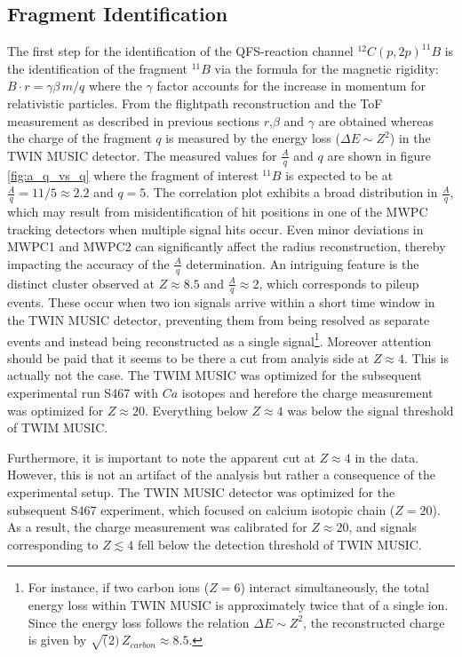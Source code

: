 \subsection{Fragment Identification}
The first step for the identification of the QFS-reaction channel $^{12}C(p,2p)^{11}B$ is the identification of the fragment $^{11}B$ via the formula for the magnetic rigidity: $ B\cdot r = \gamma\beta \, m /q$ where the $\gamma$ factor accounts for the increase in momentum for relativistic particles. From the flightpath reconstruction and the ToF measurement as described in previous sections $r$,$\beta$ and $\gamma$ are obtained whereas the charge of the fragment $q$ is measured by the energy loss ($\Delta E \sim Z^2$) in the TWIN MUSIC detector.\newline
The measured values for $\frac{A}{q}$ and $q$ are shown in figure \ref{fig:a_q_vs_q} where the fragment of interest $^{11}B$ is expected to be at $\frac{A}{q} = 11/5 \approx 2.2$ and $q = 5$. The correlation plot exhibits a broad distribution in $\frac{A}{q}$, which may result from misidentification of hit positions in one of the MWPC tracking detectors when multiple signal hits occur. Even minor deviations in MWPC1 and MWPC2 can significantly affect the radius reconstruction, thereby impacting the accuracy of the $\frac{A}{q}$ determination.\newline
An intriguing feature is the distinct cluster observed at $Z \approx 8.5$ and $\frac{A}{q} \approx 2$, which corresponds to pileup events. These occur when two ion signals arrive within a short time window in the TWIN MUSIC detector, preventing them from being resolved as separate events and instead being reconstructed as a single signal\footnote{For instance, if two carbon ions ($Z=6$) interact simultaneously, the total energy loss within TWIN MUSIC is approximately twice that of a single ion. Since the energy loss follows the relation $\Delta E \sim Z^2$, the reconstructed charge is given by $\sqrt(2)\,Z_{carbon} \approx 8.5 $.}.
Moreover attention should be paid that it seems to be there a cut from analyis side at $Z \approx 4$. This is actually not the case. The TWIM MUSIC was optimized for the subsequent experimental run S467 with $Ca$ isotopes and herefore the charge measurement was optimized for $Z\approx 20$. Everything below $Z \approx 4$ was below the signal threshold of TWIM MUSIC.

Furthermore, it is important to note the apparent cut at $Z \approx 4$ in the data. However, this is not an artifact of the analysis but rather a consequence of the experimental setup. The TWIN MUSIC detector was optimized for the subsequent S467 experiment, which focused on calcium isotopic chain ($Z = 20$). As a result, the charge measurement was calibrated for $Z \approx 20$, and signals corresponding to $Z \lesssim 4$ fell below the detection threshold of TWIN MUSIC.

